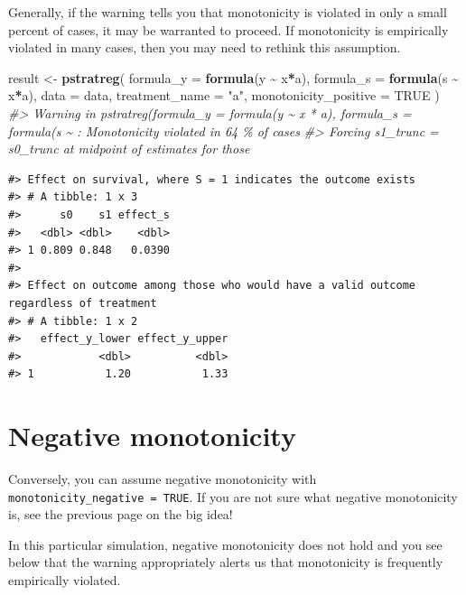 \documentclass[
]{book}
\newenvironment{Shaded}{\begin{snugshade}}{\end{snugshade}}
\newcommand{\AttributeTok}[1]{\textcolor[rgb]{0.13,0.29,0.53}{#1}}
\newcommand{\CommentTok}[1]{\textcolor[rgb]{0.56,0.35,0.01}{\textit{#1}}}
\newcommand{\ConstantTok}[1]{\textcolor[rgb]{0.56,0.35,0.01}{#1}}
\newcommand{\FunctionTok}[1]{\textcolor[rgb]{0.13,0.29,0.53}{\textbf{#1}}}
\newcommand{\NormalTok}[1]{#1}
\newcommand{\OtherTok}[1]{\textcolor[rgb]{0.56,0.35,0.01}{#1}}
\newcommand{\SpecialCharTok}[1]{\textcolor[rgb]{0.81,0.36,0.00}{\textbf{#1}}}
\newcommand{\StringTok}[1]{\textcolor[rgb]{0.31,0.60,0.02}{#1}}
\begin{document}
Generally, if the warning tells you that monotonicity is violated in only a small percent of cases, it may be warranted to proceed. If monotonicity is empirically violated in many cases, then you may need to rethink this assumption.

\begin{Shaded}
\begin{Highlighting}[]
\NormalTok{result }\OtherTok{\textless{}{-}} \FunctionTok{pstratreg}\NormalTok{(}
  \AttributeTok{formula\_y =} \FunctionTok{formula}\NormalTok{(y }\SpecialCharTok{\textasciitilde{}}\NormalTok{ x}\SpecialCharTok{*}\NormalTok{a),}
  \AttributeTok{formula\_s =} \FunctionTok{formula}\NormalTok{(s }\SpecialCharTok{\textasciitilde{}}\NormalTok{ x}\SpecialCharTok{*}\NormalTok{a),}
  \AttributeTok{data =}\NormalTok{ data,}
  \AttributeTok{treatment\_name =} \StringTok{"a"}\NormalTok{,}
  \AttributeTok{monotonicity\_positive =} \ConstantTok{TRUE}
\NormalTok{)}
\CommentTok{\#\textgreater{} Warning in pstratreg(formula\_y = formula(y \textasciitilde{} x * a), formula\_s = formula(s \textasciitilde{} : Monotonicity violated in 64 \% of cases}
\CommentTok{\#\textgreater{} Forcing s1\_trunc = s0\_trunc at midpoint of estimates for those}
\end{Highlighting}
\end{Shaded}

\begin{verbatim}
#> Effect on survival, where S = 1 indicates the outcome exists
#> # A tibble: 1 x 3
#>      s0    s1 effect_s
#>   <dbl> <dbl>    <dbl>
#> 1 0.809 0.848   0.0390
#> 
#> Effect on outcome among those who would have a valid outcome regardless of treatment
#> # A tibble: 1 x 2
#>   effect_y_lower effect_y_upper
#>            <dbl>          <dbl>
#> 1           1.20           1.33
\end{verbatim}

\section{Negative monotonicity}\label{negative-monotonicity}

Conversely, you can assume negative monotonicity with \texttt{monotonicity\_negative\ =\ TRUE}. If you are not sure what negative monotonicity is, see the previous page on the big idea!

In this particular simulation, negative monotonicity does not hold and you see below that the warning appropriately alerts us that monotonicity is frequently empirically violated.
\end{document}
